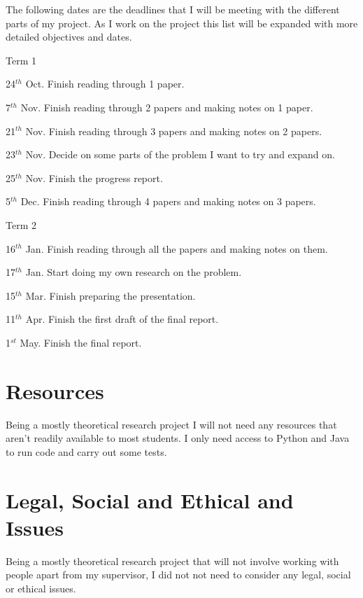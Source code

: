 \documentclass{article}
\begin{document}
The following dates are the deadlines that I will be meeting with the different parts of my project. As I work on the project this list will be expanded with more detailed objectives and dates.

\begin{flushleft}
    Term 1
    \newline
    
    24$^{th}$ Oct. Finish reading through 1 paper.
    
    7$^{th}$ Nov. Finish reading through 2 papers and making notes on 1 paper.
    
    21$^{th}$ Nov. Finish reading through 3 papers and making notes on 2 papers.
    
    23$^{th}$ Nov. Decide on some parts of the problem I want to try and expand on.
    
    25$^{th}$ Nov. Finish the progress report.
    
    5$^{th}$ Dec. Finish reading through 4 papers and making notes on 3 papers.
    \newline
    
    Term 2
    \newline
    
    16$^{th}$ Jan. Finish reading through all the papers and making notes on them.
    
    17$^{th}$ Jan. Start doing my own research on the problem.
    
    15$^{th}$ Mar. Finish preparing the presentation.
    
    11$^{th}$ Apr. Finish the first draft of the final report.
    
    1$^{st}$ May. Finish the final report.
\end{flushleft}

\section{Resources}

Being a mostly theoretical research project I will not need any resources that aren't readily available to most students. I only need access to Python and Java to run code and carry out some tests.

\section{Legal, Social and Ethical and Issues}

Being a mostly theoretical research project that will not involve working with people apart from my supervisor, I did not not need to consider any legal, social or ethical issues.
\end{document}
